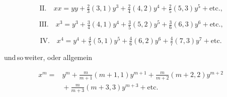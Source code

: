 \[\text{II.}\quad xx = yy+\tfrac23(3,1)y^3+\tfrac24(4,2)y^4+\tfrac25(5,3)y^5+\text{etc.,}\]

\[\text{III.}\quad x^3 = y^3+\tfrac34(4,1)y^4+\tfrac35(5,2)y^5+\tfrac36(6,3)y^6+\text{etc.,}\]

\[\text{IV.}\quad x^4 = y^4+\tfrac45(5,1)y^5+\tfrac46(6,2)y^6+\tfrac47(7,3)y^7+\text{etc.}\]

\noindent und\,so\,weiter, oder allgemein

\[
\begin{aligned}x^m ={}&y^m + \frac{m}{m+1}(m+1,1)y^{m+1}+\frac{m}{m+2}(m+2,2)y^{m+2}\\ &{}+\frac{m}{m+3}(m+3,3)y^{m+3}+\text{etc.}
\end{aligned}
\]

